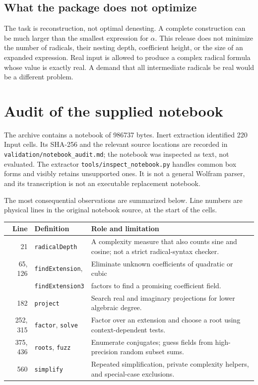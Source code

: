 \documentclass[11pt,letterpaper]{article}
\theoremstyle{definition}\newtheorem{definition}[theorem]{Definition}
\theoremstyle{remark}\newtheorem{remark}[theorem]{Remark}
\newcommand{\code}[1]{\texttt{#1}}
\begin{document}
\subsection{What the package does not optimize}
The task is reconstruction, not optimal denesting. A complete construction
can be much larger than the smallest expression for $\alpha$. This release
does not minimize the number of radicals, their nesting depth, coefficient
height, or the size of an expanded expression. Real input is allowed to
produce a complex radical formula whose value is exactly real. A demand
that all intermediate radicals be real would be a different problem.

\section{Audit of the supplied notebook}
\label{sec:audit}
The archive contains a notebook of 986737 bytes. Inert extraction identified
220 Input cells. Its SHA-256 and the relevant source locations are recorded
in \code{validation/notebook\_audit.md}; the notebook was inspected as text,
not evaluated. The extractor \code{tools/inspect\_notebook.py} handles common
box forms and visibly retains unsupported ones. It is not a general Wolfram
parser, and its transcription is not an executable replacement notebook.

The most consequential observations are summarized below. Line numbers are
physical lines in the original notebook source, at the start of the cells.
\begin{center}\small
\begin{tabularx}{\textwidth}{r l X}
\toprule
Line & Definition & Role and limitation\\\midrule
21 & \code{radicalDepth} & A complexity measure that also counts sine and cosine; not a strict radical-syntax checker.\\
65, 126 & \code{findExtension}, & Eliminate unknown coefficients of quadratic or cubic\\[-2pt]
 & \code{findExtension3} & factors to find a promising coefficient field.\\
182 & \code{project} & Search real and imaginary projections for lower algebraic degree.\\
252, 315 & \code{factor}, \code{solve} & Factor over an extension and choose a root using context-dependent tests.\\
375, 436 & \code{roots}, \code{fuzz} & Enumerate conjugates; guess fields from high-precision random subset sums.\\
560 & \code{simplify} & Repeated simplification, private complexity helpers, and special-case exclusions.\\
\bottomrule
\end{tabularx}\end{center}
\end{document}
